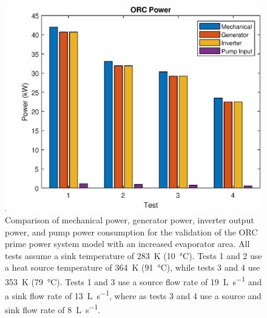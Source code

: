\begin{figure}[p]
	\centering
	
	\includegraphics[width=\textwidth]{figures/VerificationPower02}
	
	\caption{Comparison of mechanical power, generator power, inverter output power, and pump power consumption for the validation of the ORC prime power system model with an increased evaporator area. All tests assume a sink temperature of \SI{283}{\kelvin} (\SI{10}{\degreeCelsius}). Tests 1 and 2 use a heat source temperature of \SI{364}{\kelvin} (\SI{91}{\degreeCelsius}), while tests 3 and 4 use \SI{353}{\kelvin} (\SI{79}{\degreeCelsius}). Tests 1 and 3 use a source flow rate of \SI{19}{\liter\per\second} and a sink flow rate of \SI{13}{\liter\per\second}, where as tests 3 and 4 use a source and sink flow rate of \SI{8}{\liter\per\second}.
	}
	\label{fig:verificationPower02}
\end{figure}